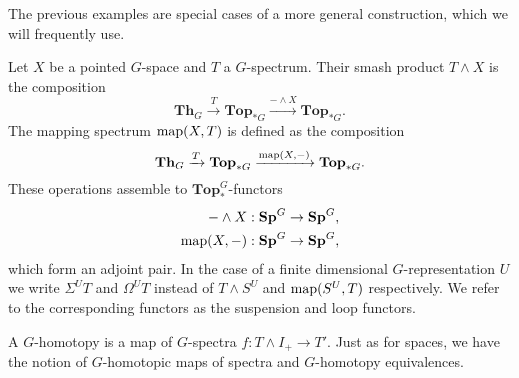 The previous examples are special cases of a more general construction,
which we will frequently use.
\begin{mydef}
Let $X$ be a pointed $G$-space and $T$ a $G$-spectrum. Their
smash product $T\wedge X$ is the composition
\[
\mathbf{Th}_G\xrightarrow{T}\mathbf{Top}_{\ast G}
\xrightarrow{-\wedge X} \mathbf{Top}_{\ast G}.
\]
The mapping spectrum $\mathrm{map}(X,T)$ is defined as the composition
\[
\mathbf{Th}_G\xrightarrow{T}\mathbf{Top}_{\ast G}
\xrightarrow{\mathrm{map}(X,-)} \mathbf{Top}_{\ast G}.
\]
These operations assemble to $\mathbf{Top}_{\ast}^G$-functors
\begin{align*}
-\wedge X: \mathbf{Sp}^G&\to \mathbf{Sp}^G,\\
\mathrm{map}(X,-):\mathbf{Sp}^G &\to \mathbf{Sp}^G,
\end{align*}
which form an adjoint pair.
In the case of a finite dimensional $G$-representation $U$
we write $\Sigma^U T$ and $\Omega^U T$ instead
of $T\wedge S^U$ and $\mathrm{map}(S^U,T)$ respectively. We refer to the corresponding functors
as the suspension and loop functors.
\end{mydef}
\begin{mydef}
A $G$-homotopy is a map of $G$-spectra $f:T\wedge I_+\to T'$. Just as for spaces,
we have the notion of $G$-homotopic maps of spectra and $G$-homotopy
equivalences.
\end{mydef}




%
%
%

